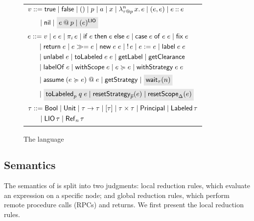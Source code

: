 \begin{figure}
    \centering
    \begin{tabular}{l}
         $\begin{aligned}[t]
         \val &::= \true \mid \false \mid () \mid p \mid \addr \mid x \mid \abs{n}{\lb{p}{\type}}{x}{\expr} \mid (\expr, \expr) \mid \cons{\expr}{\expr} \\
         &\quad \mid \nil \mid \graybox{\lb{p}{\expr} \mid \lio{\expr}}
         \end{aligned}$ \\
         $\begin{aligned}[t]
         \expr &::= \val \mid \app{\expr}{\expr} \mid \proj{i}{\expr} \mid \ifexpr{\expr}{\expr}{\expr} \mid \case{\expr}{\expr}{\expr} \mid \fix{\expr} \\ &\quad \mid \return{\expr} \mid \bind{\expr}{\expr} \mid
         \new{\expr}{\expr} \mid \readref{\expr} \mid \writeref{\expr}{\expr} \mid \Label{\expr}{\expr} \\ &\quad
         \mid \unlabel{\expr} \mid
         \tolabeled{\expr}{\expr} \mid \getlabel \mid \getclearance \\ &\quad
         \mid \labelof{\expr} \mid \withscope{\expr} \mid \expr \actsfor \expr \mid \withstrategy{\expr}{\expr} \\ &\quad \mid \adddelegate{\expr}{\expr}{\expr} \mid \getstrategy
         \mid \graybox{\wait{n}[\type]} \\ &\quad
         \mid \graybox{\internalTolabeled{p}{q}{\expr} \mid \resetstrategy{\overline{p}}{\expr} \mid \resetscope{\scope}{\expr}}
         \end{aligned}$ \\
         $\begin{aligned}[t]
         \type &::= \bool \mid \unit \mid \func{\type}{\type} \mid \listtype{\type} \mid \pair{\type}{\type} \mid \labeltype \mid \labeled{\type} \\ &\quad
         \mid \liotype{\type} \mid \reftype[n]{\type}
         \end{aligned}$
    \end{tabular}
    \caption{The \lang{} language}
    \label{fig:language-syntax}
\end{figure}

\subsection{Semantics}\label{sec:semantics}
The semantics of \lang{} is split into two judgments: local reduction rules, which evaluate an expression on a specific node; and global reduction rules, which perform remote procedure calls (RPCs) and returns. We first present the local reduction rules.

